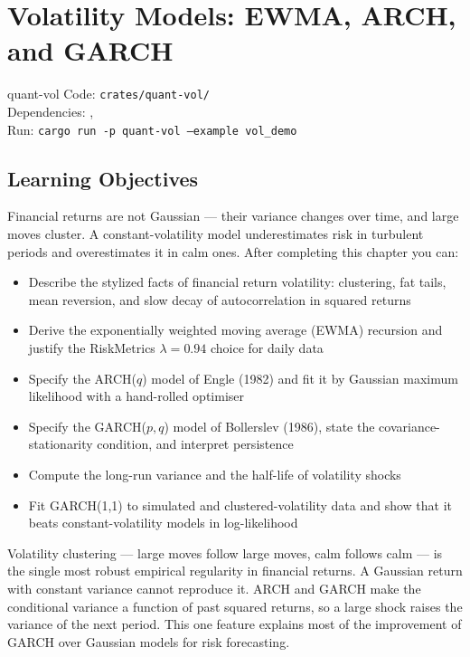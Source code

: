 \chapter{Volatility Models: EWMA, ARCH, and GARCH}
\label{ch:volatility}

\begin{companioncode}{quant-vol}
Code: \texttt{crates/quant-vol/}\\
Dependencies: , \\
Run: \texttt{cargo run -p quant-vol --example vol\_demo}
\end{companioncode}

\section{Learning Objectives}

Financial returns are not Gaussian --- their variance changes over time, and
large moves cluster. A constant-volatility model underestimates risk in
turbulent periods and overestimates it in calm ones. After completing this
chapter you can:

\begin{itemize}
    \item Describe the stylized facts of financial return volatility:
      clustering, fat tails, mean reversion, and slow decay of autocorrelation
      in squared returns
    \item Derive the exponentially weighted moving average (EWMA) recursion
      and justify the RiskMetrics $\lambda = 0.94$ choice for daily data
    \item Specify the ARCH($q$) model of Engle (1982) and fit it by Gaussian
      maximum likelihood with a hand-rolled optimiser
    \item Specify the GARCH($p, q$) model of Bollerslev (1986), state the
      covariance-stationarity condition, and interpret persistence
    \item Compute the long-run variance and the half-life of volatility shocks
    \item Fit GARCH(1,1) to simulated and clustered-volatility data and show
      that it beats constant-volatility models in log-likelihood
\end{itemize}

\begin{keyinsight}
Volatility clustering --- large moves follow large moves, calm follows calm
--- is the single most robust empirical regularity in financial returns. A
Gaussian return with constant variance cannot reproduce it. ARCH and GARCH
make the conditional variance a function of past squared returns, so a large
shock raises the variance of the next period. This one feature explains most
of the improvement of GARCH over Gaussian models for risk forecasting.
\end{keyinsight}


